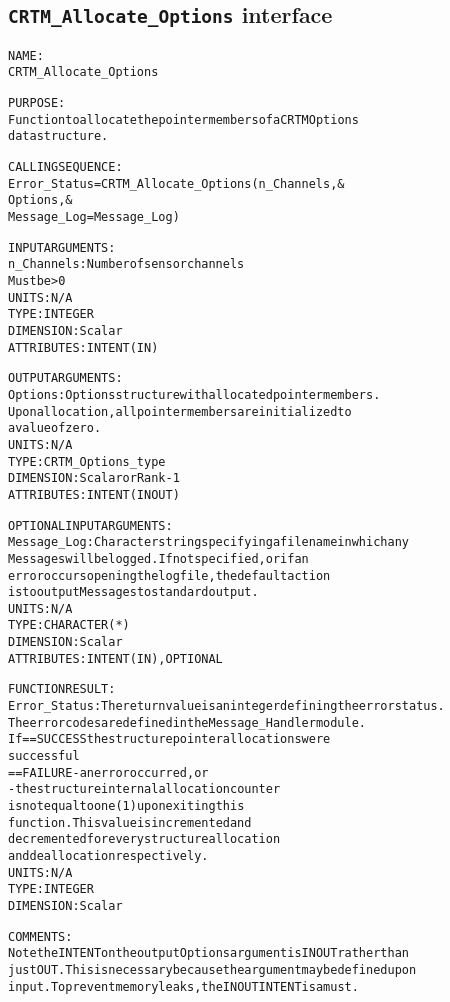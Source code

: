 \subsection{\texttt{CRTM\_Allocate\_Options} interface}
  \label{sec:CRTM_Allocate_Options_interface}
  \begin{alltt}
 
  NAME:
        CRTM_Allocate_Options
  
  PURPOSE:
        Function to allocate the pointer members of a CRTM Options
        data structure.
 
  CALLING SEQUENCE:
        Error_Status = CRTM_Allocate_Options( n_Channels             , &
                                              Options                , &
                                              Message_Log=Message_Log  )
 
  INPUT ARGUMENTS:
        n_Channels:   Number of sensor channels
                      Must be > 0
                      UNITS:      N/A
                      TYPE:       INTEGER
                      DIMENSION:  Scalar
                      ATTRIBUTES: INTENT(IN)
 
  OUTPUT ARGUMENTS:
        Options:      Options structure with allocated pointer members.
                      Upon allocation, all pointer members are initialized to
                      a value of zero.
                      UNITS:      N/A
                      TYPE:       CRTM_Options_type
                      DIMENSION:  Scalar or Rank-1
                      ATTRIBUTES: INTENT(IN OUT)
 
  OPTIONAL INPUT ARGUMENTS:
        Message_Log:  Character string specifying a filename in which any
                      Messages will be logged. If not specified, or if an
                      error occurs opening the log file, the default action
                      is to output Messages to standard output.
                      UNITS:      N/A
                      TYPE:       CHARACTER(*)
                      DIMENSION:  Scalar
                      ATTRIBUTES: INTENT(IN), OPTIONAL
 
  FUNCTION RESULT:
        Error_Status: The return value is an integer defining the error status.
                      The error codes are defined in the Message_Handler module.
                      If == SUCCESS the structure pointer allocations were
                                    successful
                         == FAILURE - an error occurred, or
                                    - the structure internal allocation counter
                                      is not equal to one (1) upon exiting this
                                      function. This value is incremented and
                                      decremented for every structure allocation
                                      and deallocation respectively.
                      UNITS:      N/A
                      TYPE:       INTEGER
                      DIMENSION:  Scalar
 
  COMMENTS:
        Note the INTENT on the output Options argument is IN OUT rather than
        just OUT. This is necessary because the argument may be defined upon
        input. To prevent memory leaks, the IN OUT INTENT is a must.
 
  \end{alltt}
